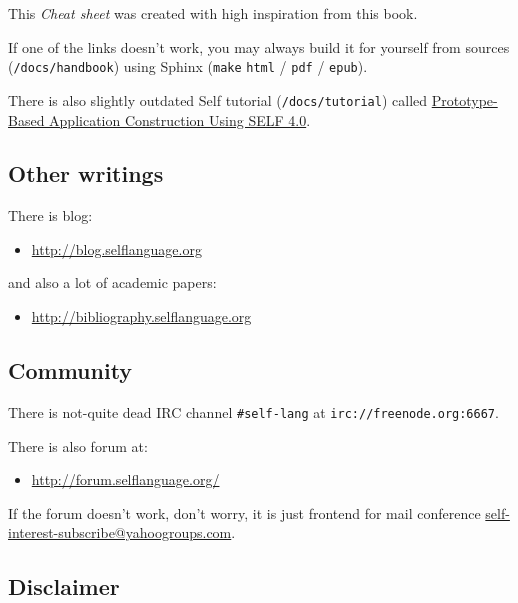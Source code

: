 \documentclass[10pt]{article}
\begin{document}
\begin{multicols*}{3}
This \textit{Cheat sheet} was created with high inspiration from this book.

If one of the links doesn't work, you may always build it for yourself from sources (\texttt{/docs/handbook}) using Sphinx (\texttt{make} \texttt{html} / \texttt{pdf} / \texttt{epub}).

There is also slightly outdated Self tutorial (\texttt{/docs/tutorial}) called \href{http://kitakitsune.org/bhole/self_tutorial/}{\footnotesize Prototype-Based Application Construction Using SELF 4.0}.



\subsection{Other writings}

There is blog:

\begin{itemize}[noitemsep]
\item \url{http://blog.selflanguage.org}
\end{itemize}

and also a lot of academic papers:

\begin{itemize}[noitemsep]
\item \url{http://bibliography.selflanguage.org}
\end{itemize}



\subsection{Community}
There is not-quite dead IRC channel \texttt{\#self-lang} at \texttt{irc://freenode.org:6667}.

There is also forum at:

\begin{itemize}[noitemsep]
\item \url{http://forum.selflanguage.org/}
\end{itemize}

If the forum doesn't work, don't worry, it is just frontend for mail conference \href{https://groups.yahoo.com/neo/groups/self-interest/info}{self-interest-subscribe@yahoogroups.com}.

\subsection{Disclaimer}


\end{multicols*}
\end{document}
